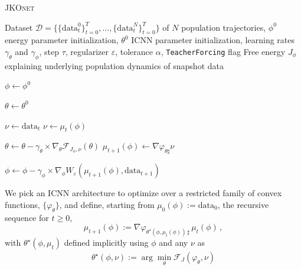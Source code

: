 \begin{algorithm}[t]
\caption{\textsc{JKOnet}}
\label{algo:jkonet}
\begin{algorithmic}

    Dataset $\mathcal{D}=\{\{\mathrm{data}_t^0 \}_{t=0}^T, \ldots, \{\mathrm{data}_t^N \}_{t=0}^T\}$ of $N$ population trajectories, $\phi^0$ energy parameter initialization, $\theta^0$ ICNN parameter initialization, learning rates $\gamma_\theta$ and $\gamma_\phi$, step $\tau$, regularizer $\varepsilon$, tolerance $\alpha$, {\texttt{TeacherForcing}} flag
    Free energy $J_{\phi}$ explaining underlying population dynamics of snapshot data
   \smallskip
   
   \STATE $\phi\leftarrow \phi^0$

   \STATE $\theta\leftarrow \theta^0$

    \STATE $\nu \leftarrow \mathrm{data}_t$
   \ELSE
   \STATE $\nu \leftarrow \mu_t(\phi)$
   \ENDIF
    
   \STATE $\theta \leftarrow \theta - \gamma_\theta \times \nabla_\theta \mathcal{F}_{J_\phi,\nu}(\theta)$
   \ENDWHILE
   \STATE $\mu_{t+1}(\phi) \leftarrow \nabla \varphi_{\theta \sharp} \nu$

   \STATE $\phi \leftarrow \phi - \gamma_\phi \times \nabla_\phi W_\varepsilon(\mu_{t+1}(\phi), \mathrm{data}_{t+1})$
   \ENDFOR
   \ENDFOR
	
\end{algorithmic}
\end{algorithm}

We pick an ICNN architecture to optimize over a restricted family of convex functions, $\{\varphi_{\theta}\}$, and define, starting from $\mu_0(\phi):=\mathrm{data}_0$, the recursive sequence for $t\geq 0$,
\begin{equation} \label{eq:next_pop}
\mu_{t+1}(\phi) := \nabla \varphi_{\theta^\star\!(\phi, \mu_t(\phi))\, \sharp}\, \mu_{t}(\phi)\,,
\end{equation}
with $\theta^\star(\phi, \mu_t)$ defined implicitly using $\phi$ and any $\nu$ as 
\begin{align} \label{eq:thetastar}
    \theta^\star(\phi, \nu):=\arg \min_{\theta} \mathcal{F}_J(\varphi_{\theta},\nu)
\end{align}

